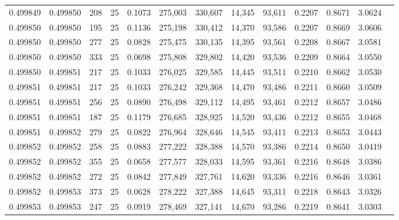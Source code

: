 \begin{tabular}{rrrrrrrrrrrrr}
0.499849 & 0.499850 &   208 &  25 &                                     0.1073 & 275,003 & 330,607 &  14,345 &  93,611 & 0.2207 & 0.8671 & 3.0624 \\
0.499850 & 0.499850 &   195 &  25 &                                     0.1136 & 275,198 & 330,412 &  14,370 &  93,586 & 0.2207 & 0.8669 & 3.0606 \\
0.499850 & 0.499850 &   277 &  25 &                                     0.0828 & 275,475 & 330,135 &  14,395 &  93,561 & 0.2208 & 0.8667 & 3.0581 \\
0.499850 & 0.499850 &   333 &  25 &                                     0.0698 & 275,808 & 329,802 &  14,420 &  93,536 & 0.2209 & 0.8664 & 3.0550 \\
0.499850 & 0.499851 &   217 &  25 &                                     0.1033 & 276,025 & 329,585 &  14,445 &  93,511 & 0.2210 & 0.8662 & 3.0530 \\
0.499851 & 0.499851 &   217 &  25 &                                     0.1033 & 276,242 & 329,368 &  14,470 &  93,486 & 0.2211 & 0.8660 & 3.0509 \\
0.499851 & 0.499851 &   256 &  25 &                                     0.0890 & 276,498 & 329,112 &  14,495 &  93,461 & 0.2212 & 0.8657 & 3.0486 \\
0.499851 & 0.499851 &   187 &  25 &                                     0.1179 & 276,685 & 328,925 &  14,520 &  93,436 & 0.2212 & 0.8655 & 3.0468 \\
0.499851 & 0.499852 &   279 &  25 &                                     0.0822 & 276,964 & 328,646 &  14,545 &  93,411 & 0.2213 & 0.8653 & 3.0443 \\
0.499852 & 0.499852 &   258 &  25 &                                     0.0883 & 277,222 & 328,388 &  14,570 &  93,386 & 0.2214 & 0.8650 & 3.0419 \\
0.499852 & 0.499852 &   355 &  25 &                                     0.0658 & 277,577 & 328,033 &  14,595 &  93,361 & 0.2216 & 0.8648 & 3.0386 \\
0.499852 & 0.499852 &   272 &  25 &                                     0.0842 & 277,849 & 327,761 &  14,620 &  93,336 & 0.2216 & 0.8646 & 3.0361 \\
0.499852 & 0.499853 &   373 &  25 &                                     0.0628 & 278,222 & 327,388 &  14,645 &  93,311 & 0.2218 & 0.8643 & 3.0326 \\
0.499853 & 0.499853 &   247 &  25 &                                     0.0919 & 278,469 & 327,141 &  14,670 &  93,286 & 0.2219 & 0.8641 & 3.0303 \\

\end{tabular}
